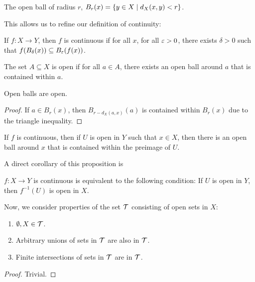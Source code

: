 \begin{definition}
    The open ball of radius $r$, $B_r(x) = \qty{y \in X \mid d_X(x, y) < r}$.
\end{definition}

This allows us to refine our definition of continuity:
\begin{definition}[Continuity]
    If $f \colon X \to Y$, then $f$ is continuous if for all $x$, for all $\varepsilon > 0$, there exists $\delta > 0$ such that $f(B_\delta(x)) \subseteq B_\varepsilon(f(x))$.
\end{definition}

\begin{definition}
    The set $A \subseteq X$ is open if for all $a \in A$, there exists an open ball around $a$ that is contained within $a$.
\end{definition}

\begin{proposition}
    Open balls are open.
\end{proposition}

\begin{proof}
    If $a \in B_r(x)$, then $B_{r - d_X(a, x)}(a)$ is contained within $B_r(x)$ due to the triangle inequality.
\end{proof}

\begin{proposition}
    If $f$ is continuous, then if $U$ is open in $Y$ such that $x \in X$, then there is an open ball around $x$ that is contained within the preimage of $U$.
\end{proposition}

A direct corollary of this proposition is 
\begin{corollary}
    $f\colon X \to Y$ is continuous is equivalent to the following condition: If $U$ is open in $Y$, then $f^{-1}(U)$ is open in $X$.
\end{corollary}

Now, we consider properties of the set $\mathcal T$ consisting of open sets in $X$:

\begin{theorem}
    \begin{enumerate}
        \item $\emptyset, X \in \mathcal T$.
        \item Arbitrary unions of sets in $\mathcal T$ are also in $\mathcal T$.
        \item Finite intersections of sets in $\mathcal T$ are in $\mathcal T$.
    \end{enumerate}
\end{theorem}
\begin{proof}
    Trivial.
\end{proof}

